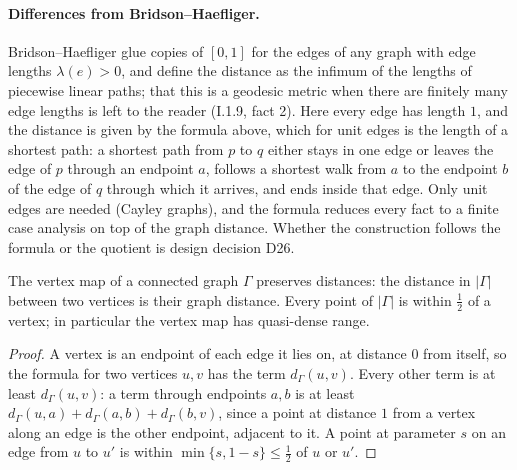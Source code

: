 \paragraph{Differences from Bridson--Haefliger.} Bridson--Haefliger glue copies of $[0, 1]$ for
the edges of any graph with edge lengths $\lambda(e) > 0$, and define the distance as the infimum of
the lengths of piecewise linear paths; that this is a geodesic metric when there are finitely many
edge lengths is left to the reader (I.1.9, fact 2). Here every edge has length $1$, and the
distance is given by the formula above, which for unit edges is the length of a shortest path: a
shortest path from $p$ to $q$ either stays in one edge or leaves the edge of $p$ through an
endpoint $a$, follows a shortest walk from $a$ to the endpoint $b$ of the edge of $q$ through
which it arrives, and ends inside that edge. Only unit edges are needed (Cayley graphs), and the formula
reduces every fact to a finite case analysis on top of the graph distance. Whether the
construction follows the formula or the quotient is design decision D26.

\begin{lemma}
  \label{SimpleGraph.Realization.dist_vertex}
  The vertex map of a connected graph $\Gamma$ preserves distances: the distance in $|\Gamma|$
  between two vertices is their graph distance. Every point of $|\Gamma|$ is within $\frac12$ of a
  vertex; in particular the vertex map has quasi-dense range.
\end{lemma}
\begin{proof}
  A vertex is an endpoint of each edge it lies on, at distance $0$ from itself, so the formula for
  two vertices $u, v$ has the term $d_\Gamma(u, v)$. Every other term is at least
  $d_\Gamma(u, v)$: a term through endpoints $a, b$ is at least $d_\Gamma(u, a) + d_\Gamma(a, b) +
  d_\Gamma(b, v)$, since a point at distance $1$ from a vertex along an edge is the other endpoint,
  adjacent to it. A point at parameter $s$ on an edge from $u$ to $u'$ is within $\min\{s, 1 - s\}
  \le \frac12$ of $u$ or $u'$.
\end{proof}

